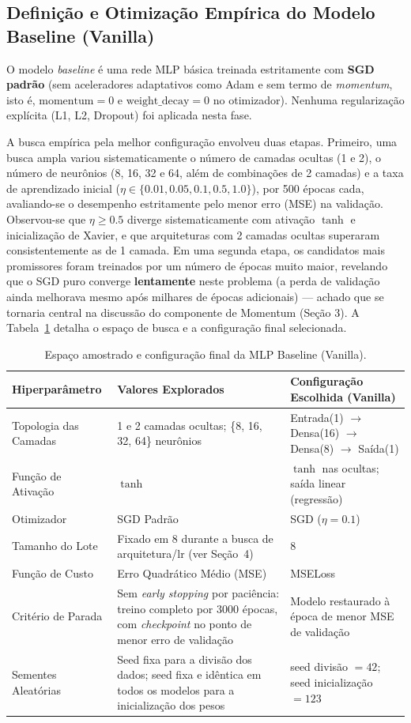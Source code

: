 \documentclass[11pt,a4paper]{article}
\begin{document}
\subsection{Definição e Otimização Empírica do Modelo Baseline (Vanilla)}
O modelo \textit{baseline} é uma rede MLP básica treinada estritamente com \textbf{SGD padrão} (sem aceleradores adaptativos como Adam e sem termo de \textit{momentum}, isto é, $\text{momentum}=0$ e $\text{weight\_decay}=0$ no otimizador). Nenhuma regularização explícita (L1, L2, Dropout) foi aplicada nesta fase.

A busca empírica pela melhor configuração envolveu duas etapas. Primeiro, uma busca ampla variou sistematicamente o número de camadas ocultas (1 e 2), o número de neurônios (8, 16, 32 e 64, além de combinações de 2 camadas) e a taxa de aprendizado inicial ($\eta \in \{0.01, 0.05, 0.1, 0.5, 1.0\}$), por 500 épocas cada, avaliando-se o desempenho estritamente pelo menor erro (MSE) na validação. Observou-se que $\eta \geq 0.5$ diverge sistematicamente com ativação $\tanh$ e inicialização de Xavier, e que arquiteturas com 2 camadas ocultas superaram consistentemente as de 1 camada. Em uma segunda etapa, os candidatos mais promissores foram treinados por um número de épocas muito maior, revelando que o SGD puro converge \textbf{lentamente} neste problema (a perda de validação ainda melhorava mesmo após milhares de épocas adicionais) — achado que se tornaria central na discussão do componente de Momentum (Seção 3). A Tabela~\ref{tab:baseline_hiper} detalha o espaço de busca e a configuração final selecionada.

\begin{table}[h]
\centering
\small
\caption{Espaço amostrado e configuração final da MLP Baseline (Vanilla).}
\label{tab:baseline_hiper}
\begin{tabularx}{\textwidth}{lXl}
\toprule
\textbf{Hiperparâmetro} & \textbf{Valores Explorados} & \textbf{Configuração Escolhida (Vanilla)} \\
\midrule
Topologia das Camadas & 1 e 2 camadas ocultas; \{8, 16, 32, 64\} neurônios & Entrada(1) $\rightarrow$ Densa(16) $\rightarrow$ Densa(8) $\rightarrow$ Saída(1) \\
Função de Ativação    & $\tanh$ & $\tanh$ nas ocultas; saída linear (regressão) \\
Otimizador            & SGD Padrão & SGD ($\eta = 0.1$) \\
Tamanho do Lote       & Fixado em 8 durante a busca de arquitetura/lr (ver Seção~4) & 8 \\
Função de Custo       & Erro Quadrático Médio (MSE) & MSELoss \\
Critério de Parada    & Sem \textit{early stopping} por paciência: treino completo por 3000 épocas, com \textit{checkpoint} no ponto de menor erro de validação & Modelo restaurado à época de menor MSE de validação \\
Sementes Aleatórias   & Seed fixa para a divisão dos dados; seed fixa e idêntica em todos os modelos para a inicialização dos pesos & seed divisão $=42$; seed inicialização $=123$ \\
\bottomrule
\end{tabularx}
\end{table}
\end{document}
